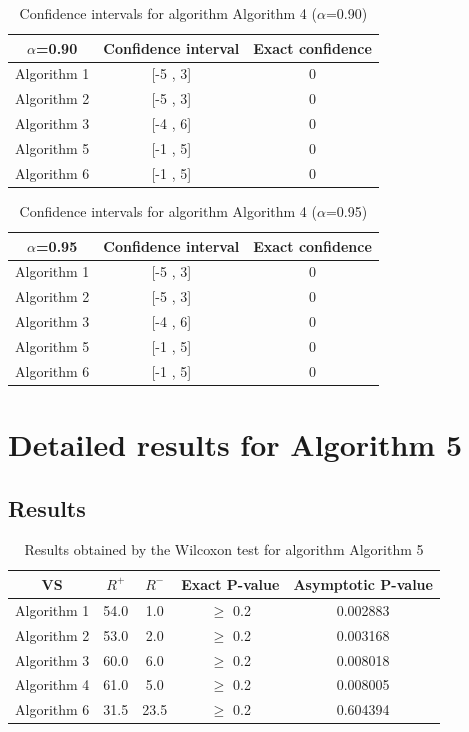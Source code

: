 \documentclass[a4paper,10pt]{article}
\begin{document}
\begin{table}[!htp]
\centering\small
\begin{tabular}{
|c|c|c|}
\hline
 $\alpha$=0.90 & Confidence interval & Exact confidence \\ \hline 
Algorithm 1 & [-5 , 3] & 0\\ \hline 
Algorithm 2 & [-5 , 3] & 0\\ \hline 
Algorithm 3 & [-4 , 6] & 0\\ \hline 
Algorithm 5 & [-1 , 5] & 0\\ \hline 
Algorithm 6 & [-1 , 5] & 0\\ \hline 

\end{tabular}
\caption{Confidence intervals for algorithm Algorithm 4 ($\alpha$=0.90)}
\end{table}
\begin{table}[!htp]
\centering\small
\begin{tabular}{
|c|c|c|}
\hline
 $\alpha$=0.95 & Confidence interval & Exact confidence \\ \hline 
Algorithm 1 & [-5 , 3] & 0\\ \hline 
Algorithm 2 & [-5 , 3] & 0\\ \hline 
Algorithm 3 & [-4 , 6] & 0\\ \hline 
Algorithm 5 & [-1 , 5] & 0\\ \hline 
Algorithm 6 & [-1 , 5] & 0\\ \hline 

\end{tabular}
\caption{Confidence intervals for algorithm Algorithm 4 ($\alpha$=0.95)}
\end{table}

 \clearpage 


\section{Detailed results for Algorithm 5}


\subsection{Results}

\begin{table}[!htp]
\centering\small
\begin{tabular}{
|c|c|c|c|c|}
\hline
 VS & $R^{+}$ & $R^{-}$ & Exact P-value & Asymptotic P-value \\ \hline 
Algorithm 1 & 54.0 & 1.0 & $\geq$ 0.2 & 0.002883\\ \hline 
Algorithm 2 & 53.0 & 2.0 & $\geq$ 0.2 & 0.003168\\ \hline 
Algorithm 3 & 60.0 & 6.0 & $\geq$ 0.2 & 0.008018\\ \hline 
Algorithm 4 & 61.0 & 5.0 & $\geq$ 0.2 & 0.008005\\ \hline 
Algorithm 6 & 31.5 & 23.5 & $\geq$ 0.2 & 0.604394\\ \hline 

\end{tabular}
\caption{Results obtained by the Wilcoxon test for algorithm Algorithm 5}
\end{table}
\end{document}
